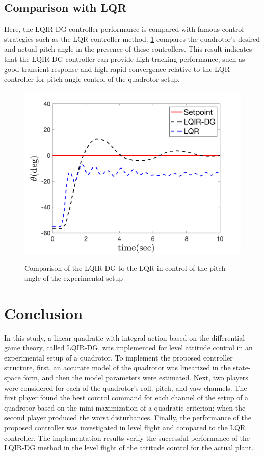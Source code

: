 \documentclass[conference]{IEEEtran}
\begin{document}
\subsection{Comparison with LQR}
\noindent Here, the LQIR-DG controller performance is compared with famous control strategies such as the LQR controller method. \figurename{\ref{fig:compare}} compares the quadrotor's desired and actual pitch angle in the presence of these controllers. This result indicates that the LQIR-DG controller can provide high tracking performance, such as good transient response and high rapid convergence relative to the LQR controller for pitch angle control of the quadrotor setup.
\begin{figure}[!h]
	\centering
	{\includegraphics[width=.9\linewidth]{../Figures/Calibration/LQIDGvsLQR/Pitch/lqidgvslqr_pitch.png}
	}
	\caption{Comparison of the LQIR-DG to the LQR in control of the pitch angle of the experimental setup}
	\label{fig:compare}
\end{figure}
\section{Conclusion}\label{sec:conclusion}
\noindent In this study, a linear quadratic with integral action based on the differential game theory, called LQIR-DG, was implemented for level attitude control in an experimental setup of a quadrotor. To implement the proposed controller structure, first, an accurate model of the quadrotor was linearized in the state-space form, and then the model parameters were estimated. Next, two players were considered for each of the quadrotor's roll, pitch, and yaw channels. The first player found the best control command for each channel of the setup of a quadrotor based on the mini-maximization of a quadratic criterion; when the second player produced the worst disturbances. Finally, the performance of the proposed controller was investigated in level flight and compared to the LQR controller. The implementation results verify the successful performance of the LQIR-DG method in the level flight of the attitude control for the actual plant.
\end{document}
